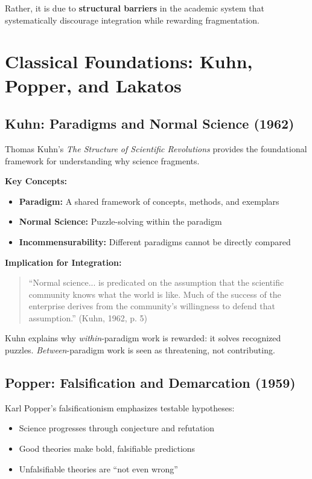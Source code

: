 Rather, it is due to \textbf{structural barriers} in the academic system that systematically discourage integration while rewarding fragmentation.



\section{Classical Foundations: Kuhn, Popper, and Lakatos}
\label{sec:meta-classics}

\subsection{Kuhn: Paradigms and Normal Science (1962)}

Thomas Kuhn's \textit{The Structure of Scientific Revolutions} provides the foundational framework for understanding why science fragments.

\textbf{Key Concepts:}
\begin{itemize}
\item \textbf{Paradigm:} A shared framework of concepts, methods, and exemplars
\item \textbf{Normal Science:} Puzzle-solving within the paradigm
\item \textbf{Incommensurability:} Different paradigms cannot be directly compared
\end{itemize}

\textbf{Implication for Integration:}
\begin{quote}
``Normal science... is predicated on the assumption that the scientific community knows what the world is like. Much of the success of the enterprise derives from the community's willingness to defend that assumption.'' (Kuhn, 1962, p. 5)
\end{quote}

Kuhn explains why \textit{within}-paradigm work is rewarded: it solves recognized puzzles. \textit{Between}-paradigm work is seen as threatening, not contributing.

\subsection{Popper: Falsification and Demarcation (1959)}

Karl Popper's falsificationism emphasizes testable hypotheses:
\begin{itemize}
\item Science progresses through conjecture and refutation
\item Good theories make bold, falsifiable predictions
\item Unfalsifiable theories are ``not even wrong''
\end{itemize}


